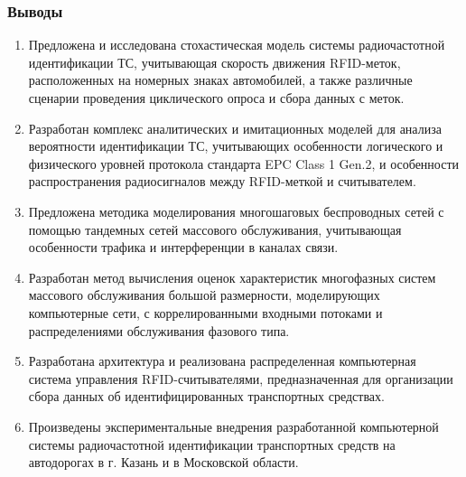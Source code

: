 \begin{frame}
    \frametitle{Выводы}
    \footnotesize
    \begin{enumerate}
        \item Предложена и исследована стохастическая модель системы радиочастотной идентификации ТС, учитывающая скорость движения RFID-меток, расположенных на номерных знаках автомобилей, а также различные сценарии проведения циклического опроса и сбора данных с меток.
        \item Разработан комплекс аналитических и имитационных моделей для анализа вероятности идентификации ТС, учитывающих особенности логического и физического уровней протокола стандарта EPC Class 1 Gen.2, и особенности распространения радиосигналов между RFID-меткой и считывателем.
        \item Предложена методика моделирования многошаговых беспроводных сетей с помощью тандемных сетей массового обслуживания, учитывающая особенности трафика и интерференции в каналах связи.
        \item Разработан метод вычисления оценок характеристик многофазных систем массового обслуживания большой размерности, моделирующих компьютерные сети, с коррелированными входными потоками и распределениями обслуживания фазового типа.
        \item Разработана архитектура и реализована распределенная компьютерная система управления RFID-считывателями, предназначенная для организации сбора данных об идентифицированных транспортных средствах.
        \item Произведены экспериментальные внедрения разработанной компьютерной системы радиочастотной идентификации транспортных средств на автодорогах в г. Казань и в Московской области.
    \end{enumerate}
\end{frame}




